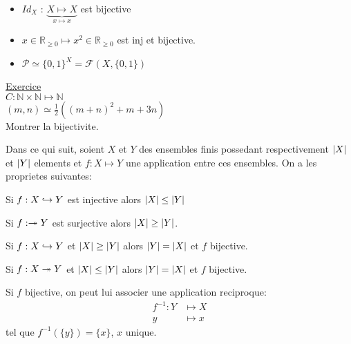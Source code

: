 \documentclass[../main.tex]{subfiles}
\begin{document}
\begin{itemize}
	\item $Id_X$ : $\underbrace{ X \mapsto X }_{x \mapsto x}$ est bijective
	\item $x \in \mathbb{R}_{\geq 0} \mapsto x^{2} \in \mathbb{R}_{\geq 0}$ est inj et bijective.
	\item $ \mathcal{P} \simeq \{0,1\}^{X} = \mathcal{F} (X, \{0,1\})$
\end{itemize}
\underline{Exercice}\\
$C: \mathbb{N} \times \mathbb{N} \mapsto \mathbb{N}$\\
$ (m,n) \simeq \frac{1}{2}( ( m+n)^{2} + m +3n)$\\
Montrer la bijectivite.


Dans ce qui suit, soient $X$ et $Y$ des ensembles finis possedant respectivement $\left\vert X\right\vert$ et $\left\vert Y\right\vert$ elements et $f: X \mapsto Y$ une application entre ces ensembles. On a les proprietes suivantes:
\begin{propo}
	Si $f: X \hookrightarrow Y$ est injective alors $ \left\vert X\right\vert \leq \left\vert Y\right\vert$
\end{propo}
\begin{propo}
	Si $f: \twoheadrightarrow Y$ est surjective alors $ \left\vert X\right\vert \geq \left\vert Y\right\vert$.
\end{propo}

\begin{propo}
	Si $f: X \hookrightarrow Y $ et $\left\vert X\right\vert \geq \left\vert Y\right\vert$ alors $\left\vert Y\right\vert = \left\vert X\right\vert$ et  $f$ bijective.
	
\end{propo}

\begin{propo}
	Si $f: X \twoheadrightarrow Y $ et $\left\vert X\right\vert \leq \left\vert Y\right\vert$ alors $\left\vert Y\right\vert = \left\vert X\right\vert$ et  $f$ bijective.
\end{propo}

\begin{propr}[Bijectivite]\label{propr:bijectivite}
Si $f$ bijective, on peut lui associer une application reciproque:
\begin{align*}
	f^{-1}: Y &\mapsto X\\
	y & \mapsto x
\end{align*}
tel que $f^{-1} ( \{y\}) = \{x\}$, $x$ unique.
\end{propr}
\end{document}
